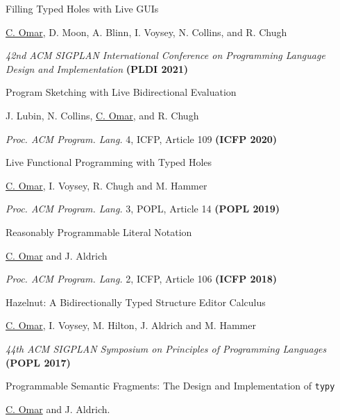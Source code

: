 \documentclass[10pt,letterpaper]{article}
\renewenvironment{itemize}{
  \begin{list}{}{
    \setlength{\leftmargin}{1.25em}
    \setlength{\itemsep}{0.25em}
    \setlength{\parskip}{0pt}
    \setlength{\parsep}{0.2em}
  }
}{
  \end{list}
}
\begin{document}
\begin{enumerate}
\item {Filling Typed Holes with Live GUIs}
  \begin{itemize}
    \item \underline{C. Omar}, D. Moon, A. Blinn, I. Voysey, N. Collins, and R. Chugh
    \item \textit{42nd ACM SIGPLAN International Conference on Programming Language Design and Implementation} \textbf{(PLDI 2021)}
  \end{itemize}
\item {Program Sketching with Live Bidirectional Evaluation}
  \begin{itemize}
    \item J. Lubin, N. Collins, \underline{C. Omar}, and R. Chugh
    \item \textit{Proc. ACM Program. Lang.} 4, ICFP, Article 109 \textbf{(ICFP 2020)}
  \end{itemize}
\item {Live Functional Programming with Typed Holes}
  \begin{itemize}
    \item \underline{C. Omar}, I. Voysey, R. Chugh and M. Hammer
    \item \textit{Proc. ACM Program. Lang.} 3, POPL, Article 14 \textbf{(POPL 2019)}
  \end{itemize}
\item {Reasonably Programmable Literal Notation}
  \begin{itemize}
    \item \underline{C. Omar} and J. Aldrich
    \item \textit{Proc. ACM Program. Lang.} 2, ICFP, Article 106 \textbf{(ICFP 2018)}
  \end{itemize}
\item {Hazelnut: A Bidirectionally Typed Structure Editor Calculus}
  \begin{itemize}
    \item \underline{C. Omar}, I. Voysey, M. Hilton, J. Aldrich and M. Hammer
    \item \textit{44th ACM SIGPLAN Symposium on Principles of Programming Languages} {\textbf{(POPL 2017)}}
  \end{itemize}
\item {Programmable Semantic Fragments: The Design and Implementation of \texttt{typy}}
  \begin{itemize}
    \item \underline{C. Omar} and J. Aldrich.

\end{itemize}
\end{enumerate}
\end{document}
